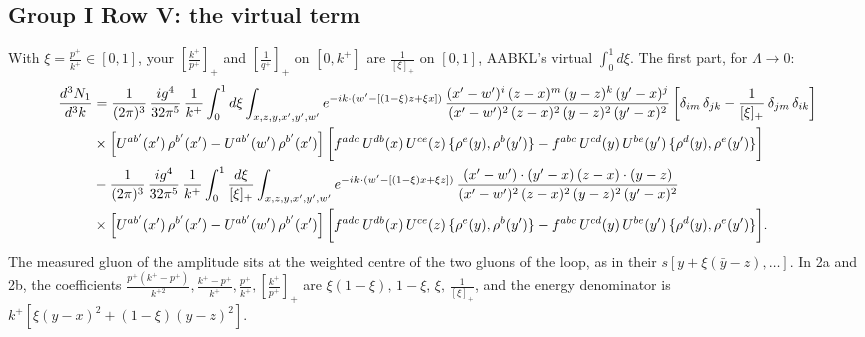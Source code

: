 \documentclass[9pt]{article}
\numberwithin{equation}{section}
\begin{document}
\subsection{Group I Row V: the virtual term}
With $\xi=\frac{p^+}{k^+}\in[0,1]$, your $\left[\frac{k^+}{p^+}\right]_+$ and $\left[\frac{1}{q^+}\right]_+$ on $[0,k^+]$ are $\frac{1}{[\xi]_+}$ on $[0,1]$, AABKL's virtual $\int_0^1d\xi$. The first part, for $\Lambda\to0$:
\begin{align}
\frac{d^{3}N_{1}}{d^{3}k}  & = \frac{1}{(2\pi)^{3}}\, \frac{ig^{4}}{32\pi^{5}}\, \frac{1}{k^{+}}\int_{0}^{1}d\xi\int_{x,z,y,x',y',w'}e^{-ik\cdot (w'-[(1-\xi)z+\xi x])}\,\frac{(x'-w')^{i}\,(z-x)^{m}\,(y-z)^{k}\,(y'-x)^{j}}{(x'-w')^{2}\,(z-x)^{2}\,(y-z)^{2}\,(y'-x)^{2}}\left[\delta_{im}\,\delta_{jk}-\frac{1}{[\xi]_+}\, \delta_{jm}\,\delta_{ik}\right]\notag \\ & \times \left[U^{ab'}(x')\,\rho^{b'}(x')-U^{ab'}(w')\,\rho^{b'}(x')\right]\bigg[f^{adc}\,U^{db}(x)\,U^{ce}(z)\, \{\rho^{e}(y),\rho^{b}(y')\}-f^{abc}\,U^{cd}(y)\,U^{be}(y')\, \{\rho^{d}(y),\rho^{e}(y')\}\bigg]\notag \\
& -\frac{1}{(2\pi)^{3}}\, \frac{ig^{4}}{32\pi^{5}}\, \frac{1}{k^{+}}\int_{0}^{1}\frac{d\xi}{[\xi]_+}\int_{x,z,y,x',y',w'}e^{-ik\cdot (w'-[(1-\xi)x+\xi z])}\,\frac{(x'-w')\cdot (y'-x)\,(z-x)\cdot (y-z)}{(x'-w')^{2}\,(z-x)^{2}\,(y-z)^{2}\,(y'-x)^{2}}\notag \\ & \times \left[U^{ab'}(x')\,\rho^{b'}(x')-U^{ab'}(w')\,\rho^{b'}(x')\right]\bigg[f^{adc}\,U^{db}(x)\,U^{ce}(z)\, \{\rho^{e}(y),\rho^{b}(y')\}-f^{abc}\,U^{cd}(y)\,U^{be}(y')\, \{\rho^{d}(y),\rho^{e}(y')\}\bigg].
\end{align}
The measured gluon of the amplitude sits at the weighted centre of the two gluons of the loop, as in their $s[y+\xi(\bar y-z),\dots]$. In 2a and 2b, the coefficients $\frac{p^+(k^+-p^+)}{k^{+2}},\frac{k^+-p^+}{k^+},\frac{p^+}{k^+},\left[\frac{k^+}{p^+}\right]_+$ are $\xi(1-\xi),\,1-\xi,\,\xi,\,\frac{1}{[\xi]_+}$, and the energy denominator is $k^+[\xi(y-x)^2+(1-\xi)(y-z)^2]$.
\end{document}
